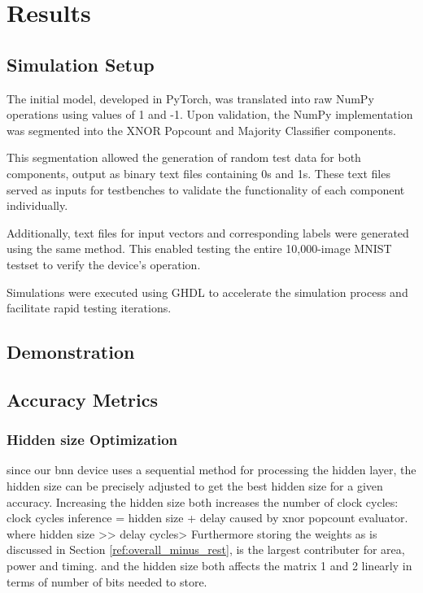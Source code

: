 \documentclass[conference]{IEEEtran}
\newcounter{todocount}
\newcommand{\todo}[1]{
  \stepcounter{todocount}
}
\begin{document}
\section{Results}
\subsection{Simulation Setup}

The initial model, developed in PyTorch, was translated into raw NumPy operations using values of 1 and -1. Upon validation, the NumPy implementation was segmented into the XNOR Popcount and Majority Classifier components.

This segmentation allowed the generation of random test data for both components, output as binary text files containing 0s and 1s. These text files served as inputs for testbenches to validate the functionality of each component individually.

Additionally, text files for input vectors and corresponding labels were generated using the same method. This enabled testing the entire 10,000-image MNIST testset to verify the device's operation.

Simulations were executed using GHDL to accelerate the simulation process and facilitate rapid testing iterations.



\subsection{Demonstration}
\todo{Demonstration show accuracy from simulation}




\subsection{Accuracy Metrics}

\subsubsection{Hidden size Optimization}

since our bnn device uses a sequential method for processing the hidden layer, the hidden size can be precisely adjusted to get the best hidden size for a given accuracy.
Increasing the hidden size both increases the number of clock cycles:  clock cycles inference = hidden size + delay caused by xnor popcount evaluator. where hidden size >> delay cycles>
Furthermore storing the weights as is discussed in Section \ref{ref:overall_minus_rest}, is the largest contributer for area, power and timing. and the hidden size both affects the matrix 1 and 2 linearly in terms of number of bits needed to store.
\end{document}
